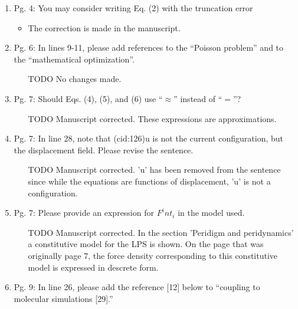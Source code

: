 \documentclass{article}
\begin{document}
\begin{enumerate}
  \item 
Pg. 4: You may consider writing Eq. (2) with the truncation error

{\color{red}  
\begin{itemize}
     \item
      The correction is made in the manuscript.
  \end{itemize}}

\item
Pg. 6: In lines 9-11, please add references to the “Poisson problem” and to the
“mathematical optimization”.

{\color{red}  
\begin{itemize}
     \item
         [TODO]
         No changes made. 
  \end{itemize}}

\item
Pg. 7: Should Eqs. (4), (5), and (6) use “$\approx$” instead of “$=$”?

{\color{red}  
\begin{itemize}
     \item
         [TODO]
         Manuscript corrected. These expressions are approximations.
  \end{itemize}}

\item
Pg. 7: In line 28, note that (cid:126)u is not the current conﬁguration, but the displacement
ﬁeld. Please revise the sentence.

{\color{red}  
\begin{itemize}
    \item
        [TODO]
        Manuscript corrected. 'u' has been removed from the sentence since while the equations are functions of displacement, 'u' is not a configuration. 
        \end{itemize}}

\item
Pg. 7: Please provide an expression for ${F^int}_i$ in the model used.

{\color{red}  
\begin{itemize}
    \item
        [TODO]
        Manuscript corrected. In the section 'Peridigm and peridynamics' a constitutive model for the LPS is shown. On the page that was originally page 7, the force density corresponding to this constitutive model is expressed in descrete form.
  \end{itemize}}

\item
Pg. 9: In line 26, please add the reference [12] below to “coupling to molecular
simulations [29].”


\end{enumerate}
\end{document}
